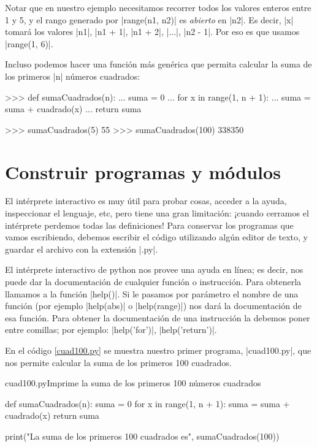 Notar que en nuestro ejemplo necesitamos recorrer todos los valores enteros
entre 1 y 5, y el rango generado por |range(n1, n2)| es {\it abierto} en |n2|.
Es decir, |x| tomará los valores |n1|, |n1 + 1|, |n1 + 2|, |...|, |n2 - 1|.
Por eso es que usamos |range(1, 6)|.

Incluso podemos hacer una función más genérica que permita calcular la suma de
los primeros |n| números cuadrados:

\begin{codigo-python-sn}
>>> def sumaCuadrados(n):
...     suma = 0
...     for x in range(1, n + 1):
...         suma = suma + cuadrado(x)
...     return suma

>>> sumaCuadrados(5)
55
>>> sumaCuadrados(100)
338350
\end{codigo-python-sn}

\section{Construir programas y módulos}

El intérprete interactivo es muy útil para probar cosas, acceder a la ayuda,
inspeccionar el lenguaje, etc, pero tiene una gran limitación: ¡cuando cerramos
el intérprete perdemos todas las definiciones! Para conservar los programas que
vamos escribiendo, debemos escribir el código utilizando algún editor de texto,
y guardar el archivo con la extensión |.py|.

\begin{sabias_que}
El intérprete interactivo de python nos provee una ayuda en línea; es decir,
nos puede dar la documentación de cualquier función o instrucción. Para
obtenerla llamamos a la función |help()|. Si le pasamos por parámetro el nombre
de una función (por ejemplo |help(abs)| o |help(range)|) nos dará la
documentación de esa función. Para obtener la documentación de una instrucción
la debemos poner entre comillas; por ejemplo: |help('for')|, |help('return')|.
\end{sabias_que}

En el código \ref{cuad100.py} se muestra nuestro primer programa, |cuad100.py|,
que nos permite calcular la suma de los primeros 100 cuadrados.

\begin{codigo}{cuad100.py}{Imprime la suma de los primeros 100 números
    cuadrados}
\label{cuad100.py}
\begin{codigo-python}
def sumaCuadrados(n):
    suma = 0
    for x in range(1, n + 1):
        suma = suma + cuadrado(x)
    return suma

print("La suma de los primeros 100 cuadrados es", sumaCuadrados(100))
\end{codigo-python}
\end{codigo}

